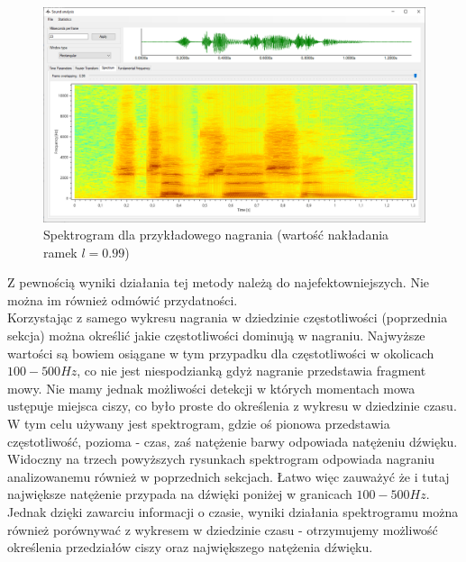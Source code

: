 \documentclass[a4paper]{article}
\begin{document}
\begin{figure}[H]
  \includegraphics[width=\linewidth]{images/06spectrogramHighOverlap.png}
  \caption{Spektrogram dla przykładowego nagrania (wartość nakładania ramek $l=0.99$)}
\end{figure}

Z pewnością wyniki działania tej metody należą do najefektowniejszych. Nie można im również odmówić przydatności.\\
Korzystając z samego wykresu nagrania w dziedzinie częstotliwości (poprzednia sekcja) można określić jakie częstotliwości dominują w nagraniu. Najwyższe wartości są bowiem osiągane w tym przypadku dla częstotliwości w okolicach $100 - 500Hz$, co nie jest niespodzianką gdyż nagranie przedstawia fragment mowy. Nie mamy jednak możliwości detekcji w których momentach mowa ustępuje miejsca ciszy, co było proste do określenia z wykresu w dziedzinie czasu.\\
W tym celu używany jest spektrogram, gdzie oś pionowa przedstawia częstotliwość, pozioma - czas, zaś natężenie barwy odpowiada natężeniu dźwięku.
Widoczny na trzech powyższych rysunkach spektrogram odpowiada nagraniu analizowanemu również w poprzednich sekcjach. Łatwo więc zauważyć że i tutaj największe natężenie przypada na dźwięki poniżej w granicach $100 - 500Hz$. Jednak dzięki zawarciu informacji o czasie, wyniki działania spektrogramu można również porównywać z wykresem w dziedzinie czasu - otrzymujemy możliwość określenia przedziałów ciszy oraz największego natężenia dźwięku.\\
\end{document}
